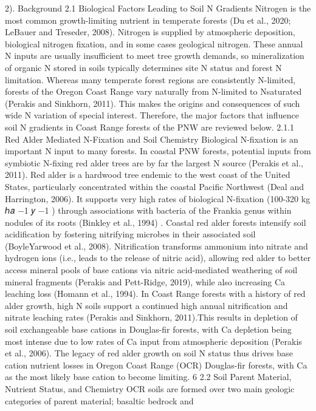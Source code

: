 \documentclass{article}
\begin{document}
2). Background
2.1 Biological Factors Leading to Soil N Gradients
Nitrogen is the most common growth-limiting nutrient in temperate forests (Du et al., 2020;
LeBauer and Treseder, 2008). Nitrogen is supplied by atmospheric deposition, biological
nitrogen fixation, and in some cases geological nitrogen. These annual N inputs are usually
insufficient to meet tree growth demands, so mineralization of organic N stored in soils typically
determines site N status and forest N limitation. Whereas many temperate forest regions are
consistently N-limited, forests of the Oregon Coast Range vary naturally from N-limited to Nsaturated (Perakis and Sinkhorn, 2011). This makes the origins and consequences of such wide N
variation of special interest. Therefore, the major factors that influence soil N gradients in Coast
Range forests of the PNW are reviewed below.
2.1.1 Red Alder Mediated N-Fixation and Soil Chemistry
Biological N-fixation is an important N input to many forests. In coastal PNW forests, potential
inputs from symbiotic N-fixing red alder trees are by far the largest N source (Perakis et al.,
2011). Red alder is a hardwood tree endemic to the west coast of the United States, particularly
concentrated within the coastal Pacific Northwest (Deal and Harrington, 2006). It supports very
high rates of biological N-fixation (100-320 kg ℎ𝑎
−1 𝑦
−1
) through associations with bacteria of
the Frankia genus within nodules of its roots (Binkley et al., 1994) . Coastal red alder forests
intensify soil acidification by fostering nitrifying microbes in their associated soil (BoyleYarwood et al., 2008). Nitrification transforms ammonium into nitrate and hydrogen ions (i.e.,
leads to the release of nitric acid), allowing red alder to better access mineral pools of base
cations via nitric acid-mediated weathering of soil mineral fragments (Perakis and Pett-Ridge,
2019), while also increasing Ca leaching loss (Homann et al., 1994). In Coast Range forests with
a history of red alder growth, high N soils support a continued high annual nitrification and
nitrate leaching rates (Perakis and Sinkhorn, 2011).This results in depletion of soil exchangeable
base cations in Douglas-fir forests, with Ca depletion being most intense due to low rates of Ca
input from atmospheric deposition (Perakis et al., 2006). The legacy of red alder growth on soil
N status thus drives base cation nutrient losses in Oregon Coast Range (OCR) Douglas-fir
forests, with Ca as the most likely base cation to become limiting. 
6
2.2 Soil Parent Material, Nutrient Status, and Chemistry
OCR soils are formed over two main geologic categories of parent material; basaltic bedrock and
\end{document}
